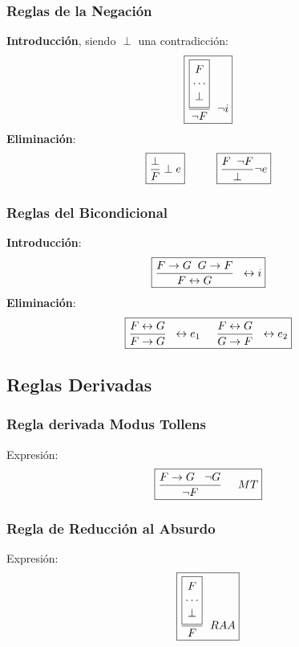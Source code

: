 \subsubsection{Reglas de la Negación}
\noindent \textbf{Introducción}, siendo \(\perp\) una contradicción:
\[
        \boxed{\frac{\boxed{\begin{matrix}
                                        F      \\
                                        \cdots \\
                                        \perp
                                \end{matrix}}}{\neg F} \hspace{2mm}\neg i}\]
\noindent \textbf{Eliminación}:
\[
        \boxed{\frac{\perp }{F} \perp e} \hspace{1cm} \boxed{\frac{F \hspace{2mm}\neg F}{\perp} \neg e}
\]
\subsubsection{Reglas del Bicondicional}
\noindent \textbf{Introducción}:
\[
        \boxed{\frac{F \rightarrow G \hspace{2mm} G \rightarrow F}{F \leftrightarrow G} \hspace{2mm} \leftrightarrow i}
\]
\noindent \textbf{Eliminación}:
\[\boxed{\frac{F \leftrightarrow G}{F \rightarrow G} \hspace{2mm} \leftrightarrow e_1 \hspace{5mm} \frac{F \leftrightarrow G}{G \rightarrow F} \hspace{2mm} \leftrightarrow e_2}
\]
\subsection{Reglas Derivadas}
\subsubsection{Regla derivada Modus Tollens}
\noindent Expresión:
\[
        \boxed{\frac{F\rightarrow G \hspace{3mm} \neg G}{\neg F} \hspace{5mm} MT}\]
\subsubsection{Regla de Reducción al Absurdo}
\noindent Expresión:
\[
        \boxed{\frac{\boxed{\begin{matrix}
                                        F      \\
                                        \cdots \\
                                        \perp
                                \end{matrix}}}{F} \hspace{2mm}RAA
        }
\]


